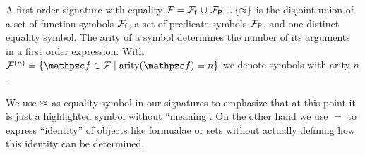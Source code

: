 
\begin{definition}\label{def:signature}
A
first order
{\myem signature} with equality
$\mathcal{F} = {\mathcal{F}_{\mathsf{f}}}\,\mathop{\dot\cup}\,{\mathcal{F}_{\mathsf{P}}}\,\mathop{\dot\cup}\,\{\approx\}$
is the disjoint union of
a set of {\myem function symbols} ${\mathcal{F}_{\mathsf{f}}}$,
a set of {\myem predicate symbols} ${\mathcal{F}_{\mathsf{P}}}$,
and one distinct equality symbol.
%
The {\myem arity} of a symbol determines the number of its arguments in a first order expression.
With $\mcFn = \{ \mcf\in\mcF \mid \arity(\mcf) = n \}$ we denote symbols with arity $n$.
\end{definition}

\begin{remark}
    We use $\approx$ as equality symbol in our signatures to emphasize
    that at this point it is just a highlighted symbol
    without “meaning”.
    On the other hand we use $=$ to express “identity” of objects
    like formualae or sets
    without actually defining how this identity can be determined.
\end{remark}
